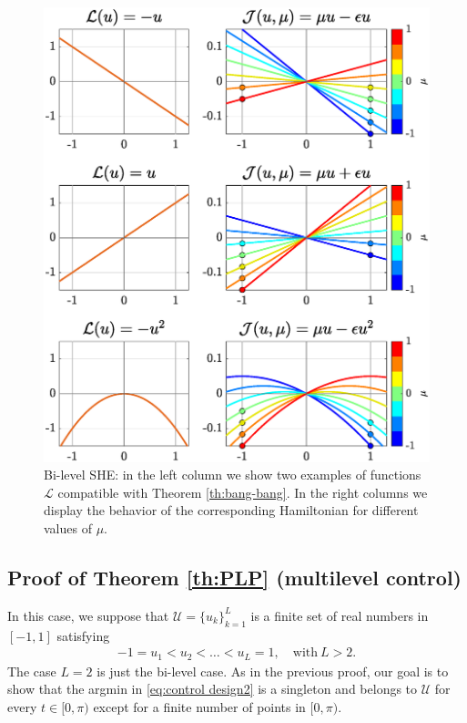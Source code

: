 \documentclass[twocolumn]{autart}    %
\begin{document}
\begin{figure}[h] 
	\centering
	\includegraphics[scale=0.415]{img/fig03.eps}
	\caption{Bi-level SHE: in the left column we show two examples of functions $\mathcal{L}$ compatible with Theorem \ref{th:bang-bang}. In the right columns we display the behavior of the corresponding Hamiltonian for different values of $\mu$.}\label{fig:Bang-Bang-penalization} 
\end{figure}

\subsection{Proof of Theorem \ref{th:PLP} (multilevel control)}\label{sec: proof:PLP}

In this case, we suppose that $\mathcal{U} = \{ u_k\}_{k=1}^L$ is a finite set of real numbers in $[-1,1]$ satisfying
\begin{align}\label{eq:order} 
	-1 = u_1 < u_2 <\ldots <u_L = 1, \quad \text{with} \ L> 2.
\end{align} 
The case $L=2$ is just the bi-level case. As in the previous proof, our goal is to show that the argmin in \eqref{eq:control design2} is a singleton and belongs to $\mathcal{U}$ for every $t\in [0,\pi)$ except for a finite number of points in $[0,\pi)$.
\end{document}
